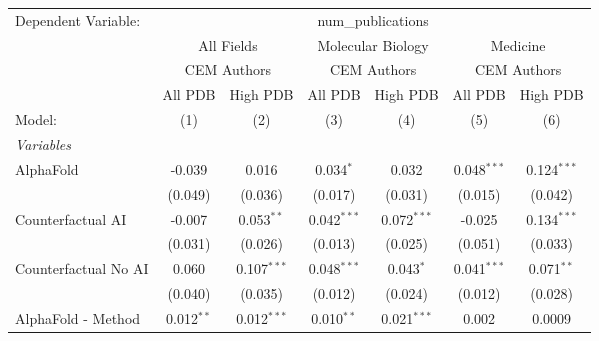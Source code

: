 \begingroup
\centering
\begin{tabular}{lcccccc}
   \tabularnewline \midrule \midrule
   Dependent Variable: & \multicolumn{6}{c}{num\_publications}\\
 & \multicolumn{2}{c}{All Fields} & \multicolumn{2}{c}{Molecular Biology} & \multicolumn{2}{c}{Medicine} \\
\cmidrule(lr){2-3} \cmidrule(lr){4-5} \cmidrule(lr){6-7}
 & \multicolumn{2}{c}{CEM Authors} & \multicolumn{2}{c}{CEM Authors} & \multicolumn{2}{c}{CEM Authors} \\
\cmidrule(lr){2-3} \cmidrule(lr){4-5} \cmidrule(lr){6-7}
 & \multicolumn{1}{c}{All PDB} & \multicolumn{1}{c}{High PDB} & \multicolumn{1}{c}{All PDB} & \multicolumn{1}{c}{High PDB} & \multicolumn{1}{c}{All PDB} & \multicolumn{1}{c}{High PDB} \\
\cmidrule(lr){2-2} \cmidrule(lr){3-3} \cmidrule(lr){4-4} \cmidrule(lr){5-5} \cmidrule(lr){6-6} \cmidrule(lr){7-7}
   Model:                                                     & (1)            & (2)           & (3)           & (4)            & (5)           & (6)\\  
   \midrule
   \emph{Variables}\\
   AlphaFold                                                  & -0.039         & 0.016         & 0.034$^{*}$   & 0.032          & 0.048$^{***}$ & 0.124$^{***}$\\   
                                                              & (0.049)        & (0.036)       & (0.017)       & (0.031)        & (0.015)       & (0.042)\\   
   Counterfactual AI                                          & -0.007         & 0.053$^{**}$  & 0.042$^{***}$ & 0.072$^{***}$  & -0.025        & 0.134$^{***}$\\   
                                                              & (0.031)        & (0.026)       & (0.013)       & (0.025)        & (0.051)       & (0.033)\\   
   Counterfactual No AI                                       & 0.060          & 0.107$^{***}$ & 0.048$^{***}$ & 0.043$^{*}$    & 0.041$^{***}$ & 0.071$^{**}$\\   
                                                              & (0.040)        & (0.035)       & (0.012)       & (0.024)        & (0.012)       & (0.028)\\   
   AlphaFold - Method                                         & 0.012$^{**}$   & 0.012$^{***}$ & 0.010$^{**}$  & 0.021$^{***}$  & 0.002         & 0.0009\\   

\end{tabular}
